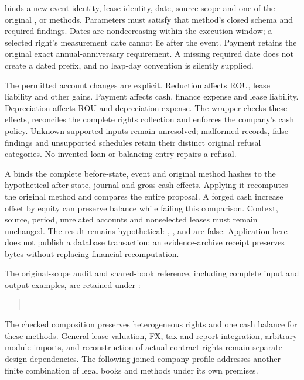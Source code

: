  binds a new event identity, lease identity, date, source
scope and one of the original ,  or
 methods. Parameters must satisfy that method's closed
schema and required findings. Dates are nondecreasing within the execution
window; a selected right's measurement date cannot lie after the event.
Payment retains the original exact annual-anniversary requirement. A missing
required date does not create a dated prefix, and no leap-day convention is
silently supplied.

The permitted account changes are explicit. Reduction affects ROU, lease
liability and other gains. Payment affects cash, finance expense and lease
liability. Depreciation affects ROU and depreciation expense. The wrapper checks
these effects, reconciles the complete rights collection and enforces the
company's cash policy. Unknown supported inputs remain unresolved; malformed
records, false findings and unsupported schedules retain their distinct original
refusal categories. No invented loan or balancing entry repairs a refusal.

A  binds the complete before-state, event and original
method hashes to the hypothetical after-state, journal and gross cash effects.
Applying it recomputes the original method and compares the entire proposal.
A forged cash increase offset by equity can preserve balance while failing
this comparison. Context, source, period, unrelated accounts and nonselected
leases must remain unchanged. The result remains hypothetical:
, ,  and
 are false. Application here does not publish a database
transaction; an evidence-archive receipt preserves bytes without replacing
financial recomputation.

The original-scope audit and shared-book reference, including complete input
and output examples, are retained under :
\begin{quote}\small
{}\\
\end{quote}
The checked composition preserves heterogeneous rights and one cash balance
for these methods. General lease valuation, FX, tax and report integration,
arbitrary module imports, and reconstruction of actual contract rights remain
separate design dependencies. The following joined-company profile addresses
another finite combination of legal books and methods under its own premises.
